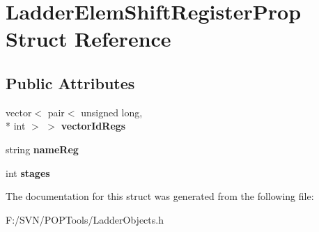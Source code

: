 \hypertarget{struct_ladder_elem_shift_register_prop}{\section{Ladder\-Elem\-Shift\-Register\-Prop Struct Reference}
\label{struct_ladder_elem_shift_register_prop}
}
\subsection*{Public Attributes}
\begin{DoxyCompactItemize}
\item 
\hypertarget{struct_ladder_elem_shift_register_prop_a867554f392d4d9d965e4e23bc2937556}{vector$<$ pair$<$ unsigned long, \\*
int $>$ $>$ {\bfseries vector\-Id\-Regs}}\label{struct_ladder_elem_shift_register_prop_a867554f392d4d9d965e4e23bc2937556}

\item 
\hypertarget{struct_ladder_elem_shift_register_prop_ae870a64e4b53e71363d0f82ae2bb2a7e}{string {\bfseries name\-Reg}}\label{struct_ladder_elem_shift_register_prop_ae870a64e4b53e71363d0f82ae2bb2a7e}

\item 
\hypertarget{struct_ladder_elem_shift_register_prop_aedfdf7a8855b1c540c9f8d8e3e913cc8}{int {\bfseries stages}}\label{struct_ladder_elem_shift_register_prop_aedfdf7a8855b1c540c9f8d8e3e913cc8}

\end{DoxyCompactItemize}


The documentation for this struct was generated from the following file\-:\begin{DoxyCompactItemize}
\item 
F\-:/\-S\-V\-N/\-P\-O\-P\-Tools/Ladder\-Objects.\-h\end{DoxyCompactItemize}
